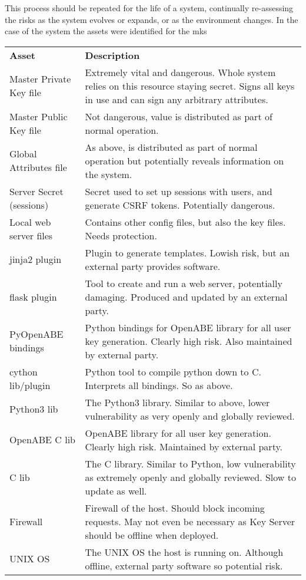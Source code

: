 This process should be repeated for the life of a system, continually re-assessing the risks as the system evolves or expands, or as the environment changes. In the case of the \theResServer system the assets were identified for the \acrfull{mks} 

\begin{table}[]
  \label{tab:assets_mk}
  \begin{tabularx}{\linewidth}{lX}
    \textbf{Asset}        & \textbf{Description} \\
    Master Private Key file   &	Extremely vital and dangerous. Whole system relies on this resource staying secret. Signs all keys in use and can sign any arbitrary attributes.  \\
    Master Public Key file    &	Not dangerous, value is distributed as part of normal operation. \\
    Global Attributes file    &	As above, is distributed as part of normal operation but potentially reveals information on the system. \\
    Server Secret (sessions)  &	Secret used to set up sessions with users, and generate CSRF tokens. Potentially dangerous. \\
    Local web server files    &	Contains other config files, but also the key files. Needs protection. \\
    jinja2 plugin             &	Plugin to generate templates. Lowish risk, but an external party provides software. \\
    flask plugin              &	Tool to create and run a web server, potentially damaging. Produced and updated by an external party. \\
    PyOpenABE bindings        &	Python bindings for OpenABE library for all user key generation. Clearly high risk. Also maintained by external party. \\
    cython lib/plugin         &	Python tool to compile python down to C. Interprets all bindings. So as above. \\
    Python3 lib               &	The Python3 library. Similar to above, lower vulnerability as very openly and globally reviewed. \\
    OpenABE C lib             &	OpenABE library for all user key generation. Clearly high risk. Maintained by external party. \\
    C lib                     &	The C library. Similar to Python, low vulnerability as extremely openly and globally reviewed. Slow to update as well. \\
    Firewall                  &	Firewall of the host. Should block incoming requests. May not even be necessary as Key Server should be offline when deployed. \\
    UNIX OS                   &	The UNIX OS the host is running on. Although offline, external party software so potential risk.
  \end{tabularx}
\end{table}

